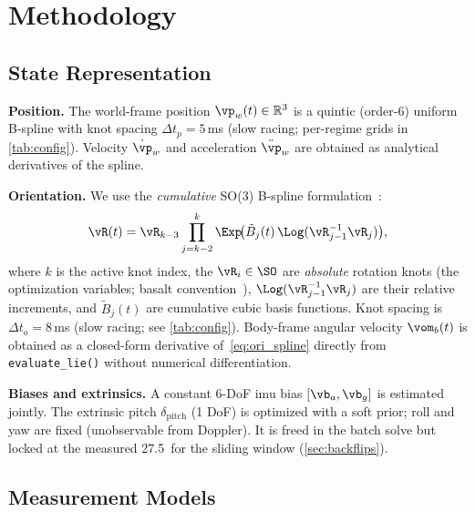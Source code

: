 \section{Methodology}
\label{sec:method}

\subsection{State Representation}
\label{sec:state}

\textbf{Position.}
The world-frame position $\vp_w(t) \in \mathbb{R}^3$ is a quintic
(order-6) uniform B-spline with knot spacing $\Delta t_p = 5$\,ms
(slow racing; per-regime grids in \autoref{tab:config}).
Velocity $\dot{\vp}_w$ and acceleration $\ddot{\vp}_w$ are
obtained as analytical derivatives of the spline.

\textbf{Orientation.}
We use the \emph{cumulative} SO(3) B-spline
formulation~\cite{sommer2020efficient,usenko2020basalt}:
\begin{equation}
  \vR(t) = \vR_{k-3}
           \prod_{j=k-2}^{k} \Exp\!\bigl(\tilde{B}_j(t)\,
           \Log(\vR_{j-1}^{-1}\vR_{j})\bigr),
  \label{eq:ori_spline}
\end{equation}
where $k$ is the active knot index, the $\vR_i \in \SO$ are \emph{absolute}
rotation knots (the optimization variables; basalt
convention~\cite{usenko2020basalt}), $\Log(\vR_{j-1}^{-1}\vR_j)$ are their
relative increments, and $\tilde{B}_j(t)$ are cumulative cubic basis
functions.  Knot spacing is $\Delta t_o = 8$\,ms (slow racing; see
\autoref{tab:config}).
Body-frame angular velocity $\vom_b(t)$
is obtained as a closed-form derivative of~\eqref{eq:ori_spline}
directly from \texttt{evaluate\_lie()} without numerical
differentiation.

\textbf{Biases and extrinsics.}
A constant 6-DoF \ac{imu} bias $[\vb_a, \vb_g]$ is estimated jointly.
The extrinsic pitch $\delta_\text{pitch}$ (1 DoF) is optimized
with a soft prior; roll and yaw are fixed (unobservable from
Doppler).  It is freed in the batch solve but locked at the measured
27.5\degree\ for the sliding window (\autoref{sec:backflips}).

\subsection{Measurement Models}
\label{sec:models}

